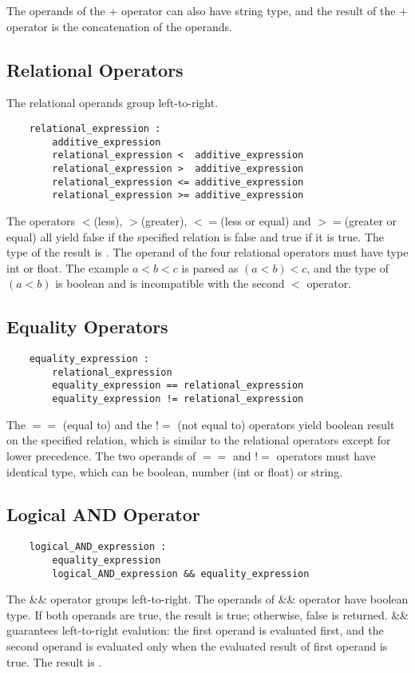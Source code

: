 \documentclass[letterpaper,12pt]{article}
\begin{document}
The operands of the + operator can also have string type, and the result of the + operator is the concatenation of the operands.\newline

\subsection{Relational Operators}
The relational operands group left-to-right.
\begin{lstlisting}
	relational_expression :
		additive_expression
		relational_expression <  additive_expression
		relational_expression >  additive_expression
		relational_expression <= additive_expression
		relational_expression >= additive_expression
\end{lstlisting}
The operators $<$(less), $>$(greater), $<=$(less or equal) and $>=$(greater or equal) all yield false if the specified relation is false and true if it is true. The type of the result is {}. The operand of the four relational operators must have type int or float. The example $a<b<c$ is parsed as $(a<b)<c$, and the type of $(a<b)$ is boolean and is incompatible with the second $<$ operator.

\subsection{Equality Operators}
\begin{lstlisting}
	equality_expression :
		relational_expression
		equality_expression == relational_expression
		equality_expression != relational_expression
\end{lstlisting}
The $==$ (equal to) and the $!=$ (not equal to) operators yield boolean result on the specified relation, which is similar to the relational operators except for lower precedence. The two operands of $==$ and $!=$ operators must have identical type, which can be boolean, number (int or float) or string. 

\subsection{Logical AND Operator}
\begin{lstlisting}
	logical_AND_expression :
		equality_expression
		logical_AND_expression && equality_expression
\end{lstlisting}
The \&\& operator groups left-to-right. The operands of \&\& operator have boolean type. If both operands are true, the result is true; otherwise, false is returned. \&\& guarantees left-to-right evalution: the first operand is evaluated first, and the second operand is evaluated only when the evaluated result of first operand is true. The result is {}. 
\end{document}
